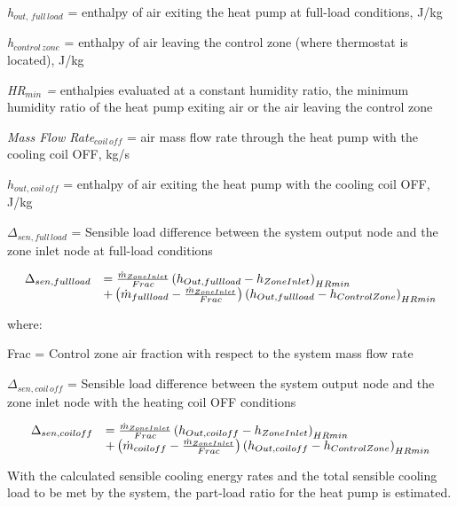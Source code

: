 \emph{h\(_{out,\, full\, load}\)} = enthalpy of air exiting the heat pump at full-load conditions, J/kg

\emph{h\(_{control \, zone}\)} = enthalpy of air leaving the control zone (where thermostat is located), J/kg

\emph{HR\(_{min}\) =} enthalpies evaluated at a constant humidity ratio, the minimum humidity ratio of the heat pump exiting air or the air leaving the control zone

\emph{Mass Flow Rate\(_{coil\, off}\)} = air mass flow rate through the heat pump with the cooling coil OFF, kg/s

\(h_{out,coil \, off}\) = enthalpy of air exiting the heat pump with the cooling coil OFF, J/kg

\(\Delta_{sen,full\, load}\) = Sensible load difference between the system output node and the zone inlet node at full-load conditions

\begin{equation}
  \begin{array}{rl}
    \Delta_{sen,full load} &= \frac{\dot{m}_{ZoneInlet}}{Frac} \PB{h_{Out,full load} - h_{ZoneInlet}}_{HRmin} \\
                           &+ \PB{\dot{m}_{full load} - \frac{\dot{m}_{ZoneInlet}}{Frac}} \PB{h_{Out,full load} - h_{ControlZone}}_{HRmin}
  \end{array}
\end{equation}

where:

Frac = Control zone air fraction with respect to the system mass flow rate

\(\Delta_{sen,coil\, off}\) = Sensible load difference between the system output node and the zone inlet node with the heating coil OFF conditions

\begin{equation}
  \begin{array}{rl}
    \Delta_{sen,coil off} &= \frac{\dot{m}_{ZoneInlet}}{Frac} \PB{h_{Out,coil off} - h_{ZoneInlet}}_{HRmin} \\
                           &+ \PB{\dot{m}_{coil off} - \frac{\dot{m}_{ZoneInlet}}{Frac}} \PB{h_{Out,coil off} - h_{ControlZone}}_{HRmin}
  \end{array}
\end{equation}

With the calculated sensible cooling energy rates and the total sensible cooling load to be met by the system, the part-load ratio for the heat pump is estimated.

